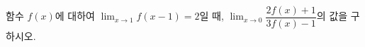 함수 $f(x)$에 대하여 $\displaystyle\lim_{x\to 1} f(x-1)=2$일 때, $\displaystyle\lim_{x\to 0}\dfrac{2f(x)+1}{3f(x)-1}$의 값을 구하시오.
